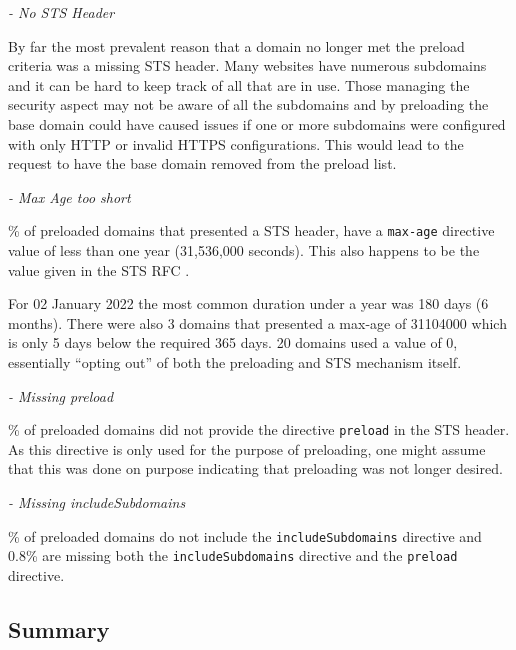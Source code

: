 \documentclass{mscreport}
\begin{document}
\vspace{0.3cm} \noindent
\textit{- No STS Header}

\vspace{0.3cm} \noindent
By far the most prevalent reason that a domain no longer met the preload criteria was a missing STS header. Many websites have numerous subdomains and it can be hard to keep track of all that are in use. Those managing the security aspect may not be aware of all the subdomains and by preloading the base domain could have caused issues if one or more subdomains were configured with only HTTP or invalid HTTPS configurations. This would lead to the request to have the base domain removed from the preload list.

\vspace{0.3cm} \noindent
\textit{- Max Age too short}

\vspace{0.3cm} \% of preloaded domains that presented a STS header, have a \texttt{max-age} directive value of less than one year (31,536,000 seconds). This also happens to be the value given in the STS RFC \cite{Hodges2012-pe}.

\vspace{0.3cm} \noindent
For 02 January 2022 the most common duration under a year was 180 days (6 months). There were also 3 domains that presented a max-age of 31104000 which is only 5 days below the required 365 days. 20 domains used a value of 0, essentially ``opting out'' of both the preloading and STS mechanism itself.

\vspace{0.3cm} \noindent
\textit{- Missing preload}

\vspace{0.3cm} \% of preloaded domains did not provide the directive \texttt{preload} in the STS header. As this directive is only used for the purpose of preloading, one might assume that this was done on purpose indicating that preloading was not longer desired.

\vspace{0.3cm} \noindent
\textit{- Missing includeSubdomains}

\vspace{0.3cm} \% of preloaded domains do not include the \texttt{includeSubdomains} directive and 0.8\% are missing both the \texttt{includeSubdomains} directive and the \texttt{preload} directive.

\subsection{Summary}
\end{document}
